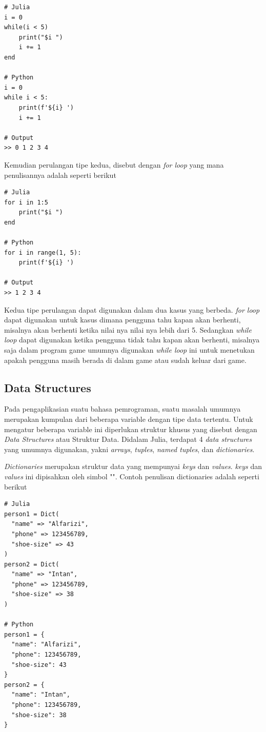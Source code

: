 \begin{lstlisting}
# Julia
i = 0
while(i < 5)
    print("$i ")
    i += 1
end

# Python
i = 0
while i < 5:
    print(f'${i} ')
    i += 1

# Output
>> 0 1 2 3 4
\end{lstlisting}

\noindent
Kemudian perulangan tipe kedua, disebut dengan \emph{for loop} yang mana
penulisannya adalah seperti berikut

\begin{lstlisting}
# Julia
for i in 1:5
    print("$i ")
end

# Python
for i in range(1, 5):
    print(f'${i} ')

# Output
>> 1 2 3 4
\end{lstlisting}

\noindent
Kedua tipe perulangan dapat digunakan dalam dua kasus yang berbeda. \emph{for
	loop} dapat digunakan untuk kasus dimana pengguna tahu kapan akan berhenti, misalnya
akan berhenti ketika nilai nya nilai nya lebih dari 5. Sedangkan \emph{while
	loop} dapat digunakan ketika pengguna tidak tahu kapan akan berhenti, misalnya saja
dalam program game umumnya digunakan \emph{while loop} ini untuk menetukan
apakah pengguna masih berada di dalam game atau sudah keluar dari game.

\subsection{Data Structures}

Pada pengaplikasian suatu bahasa pemrograman, suatu masalah umumnya merupakan
kumpulan dari beberapa variable dengan tipe data tertentu. Untuk mengatur
beberapa variable ini diperlukan struktur khusus yang disebut dengan \emph{Data
	Structures} atau Struktur Data. Didalam Julia, terdapat 4 \emph{data
	structures} yang umumnya digunakan, yakni \emph{arrays}, \emph{tuples},
\emph{named tuples}, dan \emph{dictionaries}.

\emph{Dictionaries} merupakan struktur data yang mempunyai \emph{keys} dan \emph{values}.
\emph{keys} dan \emph{values} ini dipisahkan oleh simbol "\cw{=>}". Contoh penulisan
dictionaries adalah seperti berikut

\begin{lstlisting}
# Julia
person1 = Dict(
  "name" => "Alfarizi",
  "phone" => 123456789,
  "shoe-size" => 43
)
person2 = Dict(
  "name" => "Intan",
  "phone" => 123456789,
  "shoe-size" => 38
)

# Python
person1 = {
  "name": "Alfarizi",
  "phone": 123456789,
  "shoe-size": 43
}
person2 = {
  "name": "Intan",
  "phone": 123456789,
  "shoe-size": 38
}
\end{lstlisting}

